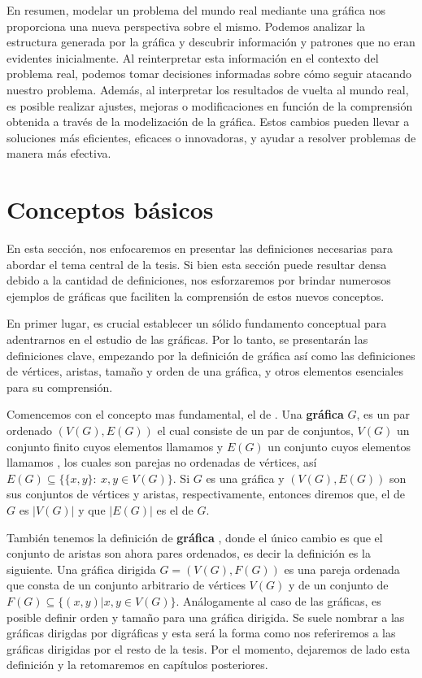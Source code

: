 En resumen, modelar un problema del mundo real mediante una gráfica nos proporciona una nueva perspectiva sobre el mismo. Podemos analizar la estructura generada por la gráfica y descubrir información y patrones que no eran evidentes inicialmente. Al reinterpretar esta información en el contexto del problema real, podemos tomar decisiones informadas sobre cómo seguir atacando nuestro problema.
Además, al interpretar los resultados de vuelta al mundo real, es posible realizar ajustes, mejoras o modificaciones en función de la comprensión obtenida a través de la modelización de la gráfica. Estos cambios pueden llevar a soluciones más eficientes, eficaces o innovadoras, y ayudar a resolver problemas de manera más efectiva.


\section{Conceptos básicos}
\label{sec:Cncpts bscs}

En esta sección, nos enfocaremos en presentar las definiciones necesarias para abordar el tema central de la tesis. Si bien esta sección puede resultar densa debido a la cantidad de definiciones, nos esforzaremos por brindar numerosos ejemplos de gráficas que faciliten la comprensión de estos nuevos conceptos.

En primer lugar, es crucial establecer un sólido fundamento conceptual para adentrarnos en el estudio de las gráficas. Por lo tanto, se presentarán las definiciones clave, empezando por la definición de gráfica así como las definiciones de vértices, aristas, tamaño y orden de una gráfica, y otros elementos esenciales para su comprensión.

Comencemos con el concepto mas fundamental, el de .
Una \textbf{gr\'afica}  $G$, es un par ordenado $(V(G), E(G))$ el cual consiste de un par de conjuntos, $V(G)$ un conjunto finito cuyos elementos llamamos  y $E(G)$ un conjunto cuyos elementos llamamos , los cuales son parejas no ordenadas de vértices, así $E(G)\subseteq \{ \{x,y\} \colon\ x,y\in V(G) \}$.  Si $G$ es una gráfica y $(V(G),E(G))$ son sus conjuntos de vértices y aristas, respectivamente, entonces diremos que, el  de $G$ es $|V(G)|$ y que $|E(G)|$ es el  de $G$.

También tenemos la definición de \textbf{gr\'afica} , donde el único cambio es que el conjunto de aristas son ahora pares ordenados, es decir la definición es la siguiente. Una gráfica dirigida $G=(V(G),F(G))$ es una pareja ordenada que consta de un conjunto arbitrario de vértices $V(G)$ y de un conjunto de  $F(G)\subseteq \{ (x,y) | x,y\in V(G) \}$.   An\'alogamente al caso de las gr\'aficas, es posible definir orden y tama\~no para una gr\'afica dirigida.
Se suele nombrar a las gráficas dirigdas por digráficas y esta será la forma como nos referiremos a las gráficas dirigidas por el resto de la tesis. Por el momento, dejaremos de lado esta definición  y la retomaremos en capítulos posteriores.


